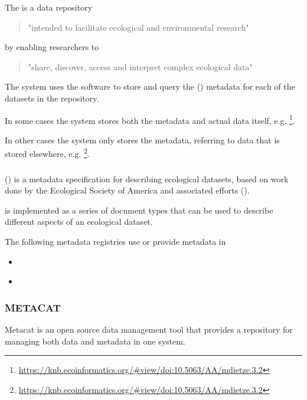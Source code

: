 \documentclass{article}
\begin{document}
The  {\cite{knb}} is a data repository
\begin{quote}
"intended to facilitate ecological and environmental research"
\end{quote}
by enabling researchers to
\begin{quote}
"share, discover, access and interpret complex ecological data"
\end{quote}

The \cite{knb} system uses the \cite{metacat} software to store and query
the  (\cite{eml}) metadata for each of the datasets in the repository.

In some cases the \cite{knb} system stores both the metadata and actual
data itself, e.g.
\footnote{\url{https://knb.ecoinformatics.org/#view/doi:10.5063/AA/mdietze.3.2}}.

In other cases the \cite{knb} system only stores the metadata,
referring to data that is stored elsewhere, e.g.
\footnote{\url{https://knb.ecoinformatics.org/#view/doi:10.5063/AA/mdietze.3.2}}.

\subsubsection{}

 (\cite{eml}) is a metadata specification
for describing ecological datasets, based on work done by the
Ecological Society of America
and associated efforts
 (\cite{michener-1997}).

\cite{eml} is implemented as a series of \cite{format-xml} document types that can be used to describe different aspects of an ecological dataset.

The following metadata registries use or provide metadata in \cite{eml}
\begin{itemize}
\item {} {\cite{knb}} 
\item {} {\cite{gbif}} 
\end{itemize}

\subsubsection{METACAT}


Metacat
is an open source data management tool that provides a repository for
managing both data and metadata in one system.
\end{document}
